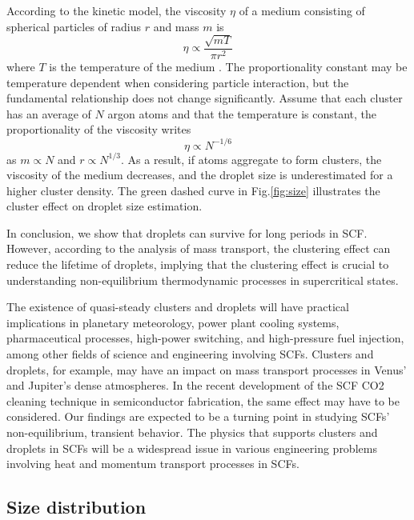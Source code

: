 According to the kinetic model, the viscosity $\eta$ of a medium consisting of spherical particles of radius $r$ and mass $m$ is
\begin{equation}
\eta \propto \frac{\sqrt{m T}}{\pi r^{2}}
\end{equation}
where $T$ is the temperature of the medium \cite{chapman1990mathematical}. The proportionality constant may be temperature dependent when considering particle interaction, but the fundamental relationship does not change significantly. Assume that each cluster has an average of $N$ argon atoms and that the temperature is constant, the proportionality of the viscosity writes
\begin{equation}
\eta \propto N^{-1 / 6}
\end{equation}
as $m \propto N$ and $r \propto N^{1/3}$. As a result, if atoms aggregate to form clusters, the viscosity of the medium decreases, and the droplet size is underestimated for a higher cluster density. The green dashed curve in Fig.\ref{fig:size} illustrates the cluster effect on droplet size estimation.

In conclusion, we show that droplets can survive for long periods in SCF. However, according to the analysis of mass transport, the clustering effect can reduce the lifetime of droplets, implying that the clustering effect is crucial to understanding non-equilibrium thermodynamic processes in supercritical states.

The existence of quasi-steady clusters and droplets will have practical implications in planetary meteorology, power plant cooling systems, pharmaceutical processes, high-power switching, and high-pressure fuel injection, among other fields of science and engineering involving SCFs. Clusters and droplets, for example, may have an impact on mass transport processes in Venus' and Jupiter's dense atmospheres. In the recent development of the SCF CO2 cleaning technique in semiconductor fabrication, the same effect may have to be considered. Our findings are expected to be a turning point in studying SCFs' non-equilibrium, transient behavior. The physics that supports clusters and droplets in SCFs will be a widespread issue in various engineering problems involving heat and momentum transport processes in SCFs.

\subsection{Size distribution}
\label{sec:ch2-4-3}

